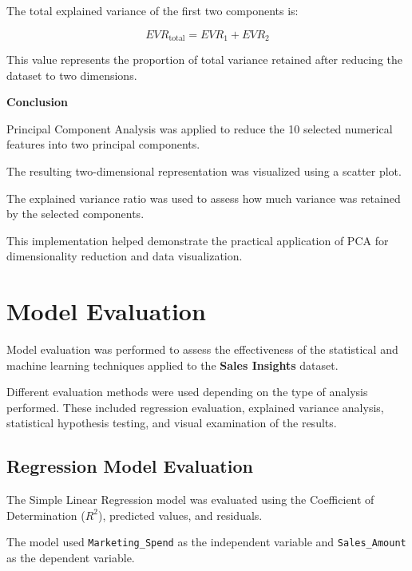 \documentclass[12pt,a4paper]{report}
\begin{document}
The total explained variance
of the first two components is:

\[
EVR_{\text{total}} = EVR_1 + EVR_2
\]

This value represents the
proportion of total variance
retained after reducing the
dataset to two dimensions.

\medskip

\noindent\textbf{Conclusion}

Principal Component Analysis
was applied to reduce the
10 selected numerical features
into two principal components.

The resulting two-dimensional
representation was visualized
using a scatter plot.

The explained variance ratio
was used to assess how much
variance was retained by
the selected components.

This implementation helped
demonstrate the practical
application of PCA for
dimensionality reduction
and data visualization.

\endgroup


\chapter{Model Evaluation}

\begingroup
\fontsize{14}{21}\selectfont

Model evaluation was performed to assess
the effectiveness of the statistical and
machine learning techniques applied to
the \textbf{Sales Insights} dataset.

Different evaluation methods were used
depending on the type of analysis performed.
These included regression evaluation,
explained variance analysis, statistical
hypothesis testing, and visual examination
of the results.


\section{Regression Model Evaluation}

The Simple Linear Regression model was
evaluated using the Coefficient of
Determination ($R^2$), predicted values,
and residuals.

The model used \texttt{Marketing\_Spend}
as the independent variable and
\texttt{Sales\_Amount} as the
dependent variable.
\end{document}
